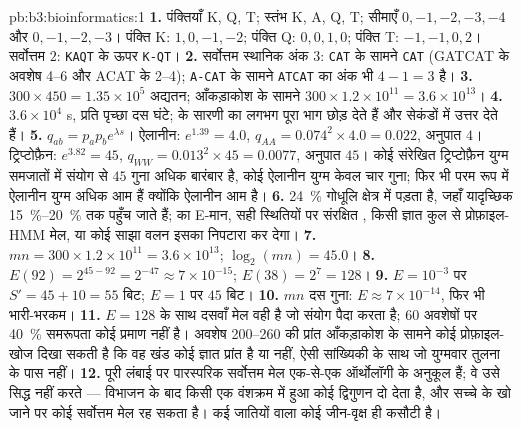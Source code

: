 \begin{solution}{pb:b3:bioinformatics:1}
\textbf{1.} पंक्तियाँ K, Q, T; स्तंभ K, A, Q, T; सीमाएँ $0,-1,-2,-3,-4$
और $0,-1,-2,-3$। पंक्ति K: $1, 0, -1, -2$; पंक्ति Q: $0, 0, 1, 0$;
पंक्ति T: $-1, -1, 0, 2$। सर्वोत्तम $2$: \texttt{KAQT} के ऊपर \texttt{K-QT}।
\textbf{2.} सर्वोत्तम स्थानिक अंक $3$: \texttt{CAT} के सामने \texttt{CAT}
(GATCAT के अवशेष 4--6 और ACAT के 2--4); \texttt{A-CAT} के सामने
\texttt{ATCAT} का अंक भी $4 - 1 = 3$ है।
\textbf{3.} $300\times 450 = 1.35\times 10^{5}$ अद्यतन; आँकड़ाकोश के
सामने $300\times 1.2\times 10^{11} = 3.6\times 10^{13}$।
\textbf{4.} $3.6\times 10^{4}$ s, प्रति पृच्छा दस घंटे;  के 
सारणी का लगभग पूरा भाग छोड़ देते हैं और सेकंडों में उत्तर देते हैं।
\textbf{5.} $q_{ab} = p_{a}p_{b}e^{\lambda s}$। ऐलानीन: $e^{1.39} = 4.0$,
$q_{AA} = 0.074^{2}\times 4.0 = 0.022$, अनुपात $4$। ट्रिप्टोफ़ैन:
$e^{3.82} = 45$, $q_{WW} = 0.013^{2}\times 45 = 0.0077$, अनुपात $45$।
कोई संरेखित ट्रिप्टोफ़ैन युग्म समजातों में संयोग से $45$ गुना अधिक
बारंबार है, कोई ऐलानीन युग्म केवल चार गुना; फिर भी परम रूप में ऐलानीन
युग्म अधिक आम हैं क्योंकि ऐलानीन आम है।
\textbf{6.} \qty{24}{\%} गोधूलि क्षेत्र में पड़ता है, जहाँ यादृच्छिक
 \qtyrange{15}{20}{\%} तक पहुँच जाते हैं;  का E-मान, सही
स्थितियों पर संरक्षित , किसी ज्ञात कुल से प्रोफ़ाइल-HMM मेल,
या कोई साझा वलन इसका निपटारा कर देगा।
\textbf{7.} $mn = 300\times 1.2\times 10^{11} = 3.6\times 10^{13}$;
$\log_{2}(mn) = 45.0$।
\textbf{8.} $E(92) = 2^{45 - 92} = 2^{-47} \approx 7\times 10^{-15}$;
$E(38) = 2^{7} = 128$।
\textbf{9.} $E = 10^{-3}$ पर $S' = 45 + 10 = 55$ बिट; $E = 1$ पर $45$
बिट।
\textbf{10.} $mn$ दस गुना: $E \approx 7\times 10^{-14}$, फिर भी
भारी-भरकम।
\textbf{11.} $E = 128$ के साथ दसवाँ मेल वही है जो संयोग पैदा करता है;
$60$ अवशेषों पर \qty{40}{\%} समरूपता कोई प्रमाण नहीं है। अवशेष 200--260
की प्रांत आँकड़ाकोश के सामने कोई प्रोफ़ाइल-खोज दिखा सकती है कि वह खंड
कोई ज्ञात प्रांत है या नहीं, ऐसी सांख्यिकी के साथ जो युग्मवार तुलना के
पास नहीं।
\textbf{12.} पूरी लंबाई पर पारस्परिक सर्वोत्तम मेल एक-से-एक ऑर्थोलॉगी
के अनुकूल हैं; वे उसे सिद्ध नहीं करते --- विभाजन के बाद किसी एक
वंशक्रम में हुआ कोई द्विगुणन दो  देता है, और सच्चे
 के खो जाने पर कोई  सर्वोत्तम मेल रह सकता है। कई
जातियों वाला कोई जीन-वृक्ष ही कसौटी है।

\end{solution}
